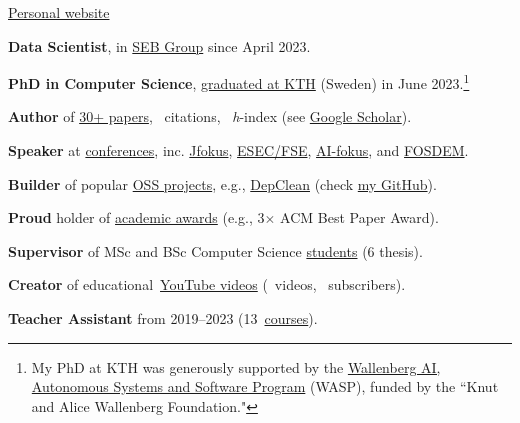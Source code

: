 \documentclass{files/CV/cesar}
\begin{document}


\ybPrintPhoto{}

{\scshape\bfseries\Large {}}

 \href{https://www.cesarsotovalero.net}{Personal website}

\onehalfspacing

\vspace{1.5em}

\textbf{Data Scientist}, in \href{https://www.linkedin.com/in/cesarsotovalero/}{SEB Group} since April 2023.

\textbf{PhD in Computer Science}, \href{https://kth.diva-portal.org/smash/record.jsf?pid=diva2%3A1755964&dswid=5947}{graduated at KTH} (Sweden) in June 2023.\footnote[1]{My PhD at KTH was generously supported by the \href{https://wasp-sweden.org/}{Wallenberg AI, Autonomous Systems and Software Program} (WASP), funded by the ``Knut and Alice Wallenberg Foundation."}

\textbf{Author} of \href{https://www.cesarsotovalero.net/publications}{30+ papers}, \citations~citations, \hindex~\emph{h}-index (see \href{https://scholar.google.es/citations?user=jNBoowwAAAAJ&hl=en}{Google Scholar}).

\textbf{Speaker} at \href{https://www.cesarsotovalero.net/talks}{conferences}, inc.
  \href{https://youtu.be/Xn1ShZPrw2o?si=TFJIJjrmGg5CzxZm}{Jfokus},
  \href{https://youtu.be/cePEl485E_s}{ESEC/FSE},
  \href{https://youtu.be/kFPE9EcxhCs}{AI-fokus}, and
  \href{https://youtu.be/8SndbPMwdWE}{FOSDEM}.

\textbf{Builder} of popular \href{https://www.cesarsotovalero.net/software}{OSS projects}, e.g., \href{https://github.com/castor-software/depclean}{DepClean} (check \href{https://github.com/cesarsotovalero}{my GitHub}).

\textbf{Proud} holder of \href{https://www.cesarsotovalero.net/awards}{academic awards} (e.g., 3$\times$ ACM Best Paper Award).

\textbf{Supervisor} of MSc and BSc Computer Science \href{hhttps://www.cesarsotovalero.net/service#thesis-supervisor}{students} (6 thesis).

\textbf{Creator} of educational~\href{https://www.youtube.com/@cesarsotovalero}{YouTube videos} (\youtubevideos~videos, \ytSubscribers~subscribers).

\textbf{Teacher Assistant} from 2019--2023 (13~\href{https://www.cesarsotovalero.net/service#teaching}{courses}).
\end{document}
